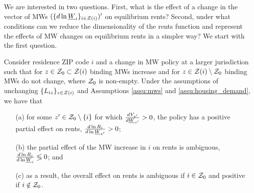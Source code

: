 We are interested in two questions.
First, what is the effect of a change in the vector of MWs 
$(\{d \ln \underline{W}_i\}_{i\in\mathcal{Z}(i)})'$ on equilibrium rents?
Second, under what conditions can we reduce the dimensionality of the rents 
function and represent the effects of MW changes on equilibrium rents in a 
simpler way?
We start with the first question.

\begin{prop}\label{prop:comparative_statics}
    Consider residence ZIP code $i$ and a change in MW policy at a larger
    jurisdiction such that for $z\in\mathcal{Z}_0 \subset \mathcal{Z}(i)$ binding MWs increase 
    and for $z\in\mathcal{Z}(i)\setminus \mathcal{Z}_0$ binding MWs do not change,
    where $\mathcal{Z}_0$ is non-empty.
    Under the assumptions of unchanging $\{L_{iz}\}_{z\in\mathcal{Z}(i)}$ 
    and Assumptions \ref{assu:mws} and \ref{assu:housing_demand},
    we have that
    \begin{enumerate}
        \item[(a)]
        for some $z'\in\mathcal{Z}_0\setminus\{i\}$ for which $\frac{d Y_{z'}}{d \underline{W}_{z'}}>0$, 
        the policy has a positive partial effect on rents, 
        $\frac{d\ln R_i}{d\ln\underline{W}_{z'}} > 0$;
        \item[(b)]
        the partial effect of the MW increase in $i$ on rents is ambiguous, 
        $\frac{d\ln R_i}{d\ln\underline{W}_i} \lessgtr 0$; and
        \item[(c)]
        as a result, the overall effect on rents is ambiguous if $i\in\mathcal{Z}_0$ 
        and positive if $i\notin\mathcal{Z}_0$.
    \end{enumerate}
\end{prop}

